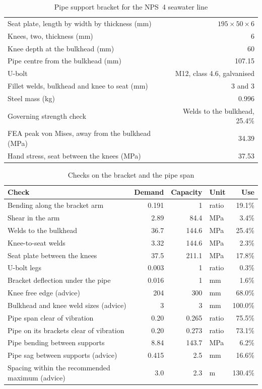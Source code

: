 \begin{table}[H]
\centering
\caption{Pipe support bracket for the NPS~4 seawater line}
\label{tab:bracket-design}
\small
\begin{tabular}{lr}
\toprule
Seat plate, length by width by thickness (mm) & $195 \times 50 \times 6$\\
Knees, two, thickness (mm) & 6\\
Knee depth at the bulkhead (mm) & 60\\
Pipe centre from the bulkhead (mm) & 107.15\\
U-bolt & M12, class 4.6, galvanised\\
Fillet welds, bulkhead and knee to seat (mm) & 3 and 3\\
Steel mass (kg) & 0.996\\
Governing strength check & Welds to the bulkhead, 25.4\%\\
FEA peak von Mises, away from the bulkhead (MPa) & 34.39\\
Hand stress, seat between the knees (MPa) & 37.53\\
\bottomrule
\end{tabular}
\end{table}

\begin{table}[H]
\centering
\caption{Checks on the bracket and the pipe span}
\label{tab:bracket-checks-result}
\small
\begin{tabularx}{\textwidth}{>{\raggedright\arraybackslash}Xrrlr}
\toprule
\textbf{Check} & \textbf{Demand} & \textbf{Capacity} & \textbf{Unit} & \textbf{Use}\\
\midrule
Bending along the bracket arm & 0.191 & 1 & ratio & 19.1\%\\
Shear in the arm & 2.89 & 84.4 & MPa & 3.4\%\\
Welds to the bulkhead & 36.7 & 144.6 & MPa & 25.4\%\\
Knee-to-seat welds & 3.32 & 144.6 & MPa & 2.3\%\\
Seat plate between the knees & 37.5 & 211.1 & MPa & 17.8\%\\
U-bolt legs & 0.003 & 1 & ratio & 0.3\%\\
Bracket deflection under the pipe & 0.016 & 1 & mm & 1.6\%\\
Knee free edge (advice) & 204 & 300 & mm & 68.0\%\\
Bulkhead and knee weld sizes (advice) & 3 & 3 & mm & 100.0\%\\
\midrule
Pipe span clear of vibration & 0.20 & 0.265 & ratio & 75.5\%\\
Pipe on its brackets clear of vibration & 0.20 & 0.273 & ratio & 73.1\%\\
Pipe bending between supports & 8.84 & 143.7 & MPa & 6.2\%\\
Pipe sag between supports (advice) & 0.415 & 2.5 & mm & 16.6\%\\
Spacing within the recommended maximum (advice) & 3.0 & 2.3 & m & 130.4\%\\
\bottomrule
\end{tabularx}
\end{table}

